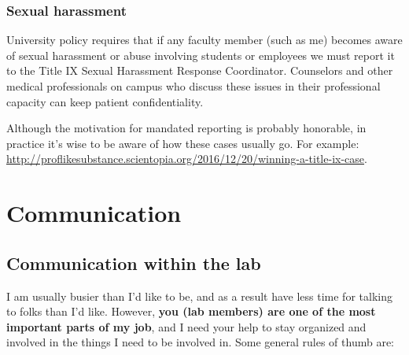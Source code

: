 \documentclass[letterpaper,12pt,oneside]{memoir}
\begin{document}
\subsection{Sexual harassment}
University policy requires that if any faculty member (such as me) becomes aware of  sexual harassment or abuse involving students or employees we must report it to the Title IX Sexual Harassment Response Coordinator. Counselors and other medical professionals on campus who discuss these issues in their professional capacity can keep patient confidentiality.

Although the motivation for mandated reporting is probably honorable, in practice it's wise to be aware of how these cases usually go. For example: \href{http://proflikesubstance.scientopia.org/2016/12/20/winning-a-title-ix-case/}{http://proflikesubstance.scientopia.org/2016/12/20/winning-a-title-ix-case}.




\chapter{Communication}
\section{Communication within the lab}
\label{sec:communicationInLab}

I am usually busier than I'd like to be, and as a result have less time for talking to folks than I'd like. However, \textbf{you (lab members) are one of the most important parts of my job}, and I need your help to stay organized and involved in the things I need to be involved in. Some general rules of thumb are:
\end{document}
